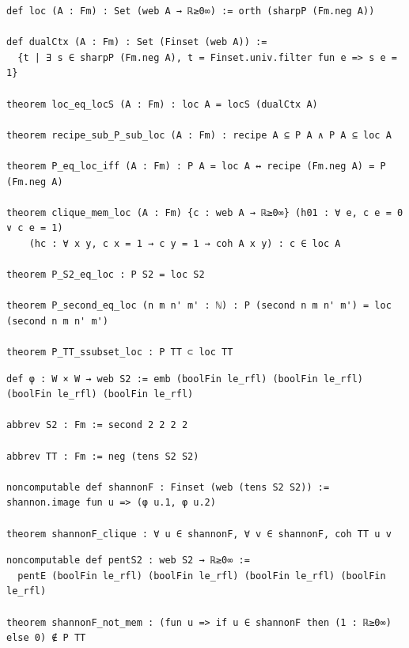 \begin{lstlisting}
def loc (A : Fm) : Set (web A → ℝ≥0∞) := orth (sharpP (Fm.neg A))

def dualCtx (A : Fm) : Set (Finset (web A)) :=
  {t | ∃ s ∈ sharpP (Fm.neg A), t = Finset.univ.filter fun e => s e = 1}

theorem loc_eq_locS (A : Fm) : loc A = locS (dualCtx A)

theorem recipe_sub_P_sub_loc (A : Fm) : recipe A ⊆ P A ∧ P A ⊆ loc A

theorem P_eq_loc_iff (A : Fm) : P A = loc A ↔ recipe (Fm.neg A) = P (Fm.neg A)

theorem clique_mem_loc (A : Fm) {c : web A → ℝ≥0∞} (h01 : ∀ e, c e = 0 ∨ c e = 1)
    (hc : ∀ x y, c x = 1 → c y = 1 → coh A x y) : c ∈ loc A

theorem P_S2_eq_loc : P S2 = loc S2

theorem P_second_eq_loc (n m n' m' : ℕ) : P (second n m n' m') = loc (second n m n' m')

theorem P_TT_ssubset_loc : P TT ⊂ loc TT
\end{lstlisting}

\begin{lstlisting}
def φ : W × W → web S2 := emb (boolFin le_rfl) (boolFin le_rfl) (boolFin le_rfl) (boolFin le_rfl)

abbrev S2 : Fm := second 2 2 2 2

abbrev TT : Fm := neg (tens S2 S2)

noncomputable def shannonF : Finset (web (tens S2 S2)) := shannon.image fun u => (φ u.1, φ u.2)

theorem shannonF_clique : ∀ u ∈ shannonF, ∀ v ∈ shannonF, coh TT u v
\end{lstlisting}

\begin{lstlisting}
noncomputable def pentS2 : web S2 → ℝ≥0∞ :=
  pentE (boolFin le_rfl) (boolFin le_rfl) (boolFin le_rfl) (boolFin le_rfl)

theorem shannonF_not_mem : (fun u => if u ∈ shannonF then (1 : ℝ≥0∞) else 0) ∉ P TT
\end{lstlisting}

